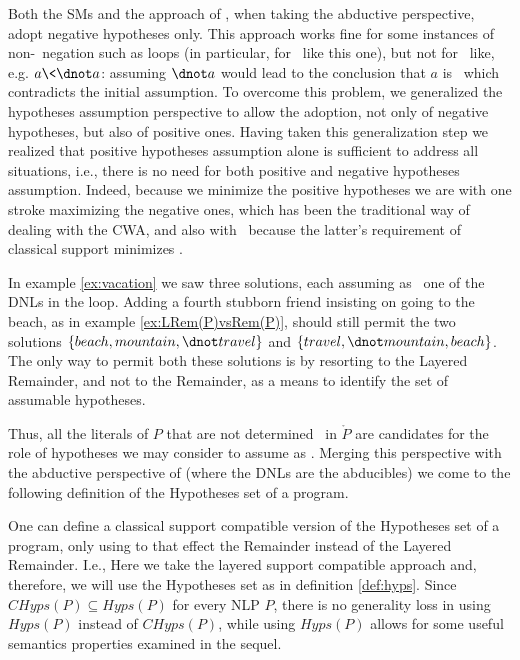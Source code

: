 \documentclass{llncs}
\begin{document}
			Both the SMs and the approach of \cite{DBLP:journals/logcom/KakasKT92}, when taking the abductive perspective, adopt negative
			hypotheses only.
This approach works fine for some instances of non-\wf\ negation such as loops (in particular, for \elons\ like this one), but not for
			\olons\ like, e.g. $a\<\dnot a$:
			assuming $\dnot a$ would lead to the conclusion that $a$ is \true\ which contradicts the initial assumption.
			To overcome this problem, we generalized the hypotheses assumption perspective to allow the adoption, not only of negative hypotheses,
			but also of positive ones.
			Having taken this generalization step we realized that positive hypotheses assumption alone is sufficient to address all situations, i.e.,
			there is no need for both positive and negative hypotheses assumption.
			Indeed, because we minimize the positive hypotheses we are with one stroke maximizing the negative ones, which has been the traditional
			way of dealing with the CWA, and also with \sms\ because the latter's requirement of classical support minimizes \ms.


			In example \ref{ex:vacation} we saw three solutions, each assuming as \true\ one of the DNLs in the loop.
			Adding a fourth stubborn friend insisting on going to the beach, as in example \ref{ex:LRem(P)vsRem(P)}, should still permit the two
			solutions $\{beach, mountain, \dnot travel\}$ and $\{travel,\dnot mountain, beach\}$.
			The only way to permit both these solutions is by resorting to the Layered Remainder, and not to the Remainder, as a means to identify
			the set of assumable hypotheses.
			
Thus, all the literals of $P$ that are not determined \false\ in
$\mathring{P}$
are candidates for the role of hypotheses we may consider to assume as \true.
Merging this perspective with the abductive perspective of \cite{DBLP:journals/logcom/KakasKT92} (where the DNLs are the abducibles) we 
			come to the following definition of the Hypotheses set of a program.
			
			One can define a classical support compatible version of the Hypotheses set of a program, only using to that effect the Remainder 
			instead of the Layered Remainder. I.e.,	
			Here we take the layered support compatible approach and, therefore, we will use the Hypotheses set as in definition
			\ref{def:hyps}.
			Since $CHyps(P)\subseteq Hyps(P)$ for every NLP $P$, there is no generality loss in using $Hyps(P)$ instead of $CHyps(P)$, while
			using $Hyps(P)$ allows for some useful semantics properties examined in the sequel.		
\end{document}
